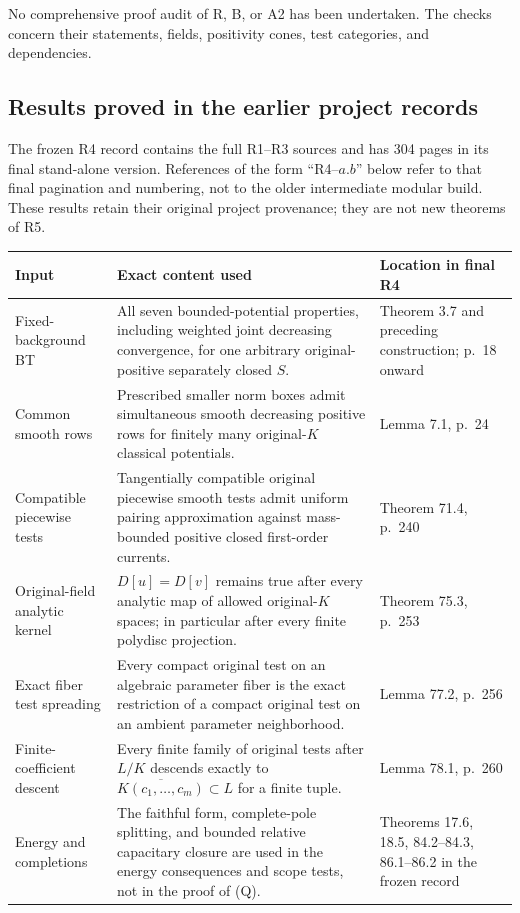 \documentclass[11pt,a4paper]{article}
\numberwithin{equation}{section}
\theoremstyle{definition}
\theoremstyle{remark}
\begin{document}
No comprehensive proof audit of R, B, or A2 has been undertaken.
The checks concern their statements, fields, positivity cones,
test categories, and dependencies.

\subsection{Results proved in the earlier project records}

The frozen R4 record contains the full R1--R3 sources and has
304 pages in its final stand-alone version. References of the
form ``R4--$a.b$'' below refer to that final pagination and
numbering, not to the older intermediate modular build. These
results retain their original project provenance; they are not
new theorems of R5.

\begin{longtable}{@{}p{}p{}p{}@{}}
\toprule
Input & Exact content used & Location in final R4\\
\midrule
\endhead
Fixed-background BT & All seven bounded-potential properties,
including weighted joint decreasing convergence, for one
arbitrary original-positive separately closed $S$. &
Theorem 3.7 and preceding construction; p.~18 onward\\
Common smooth rows & Prescribed smaller norm boxes admit
simultaneous smooth decreasing positive rows for finitely
many original-$K$ classical potentials. & Lemma 7.1, p.~24\\
Compatible piecewise tests & Tangentially compatible original
piecewise smooth tests admit uniform pairing approximation
against mass-bounded positive closed first-order currents. &
Theorem 71.4, p.~240\\
Original-field analytic kernel & $D[u]=D[v]$ remains true
after every analytic map of allowed original-$K$ spaces;
in particular after every finite polydisc projection. &
Theorem 75.3, p.~253\\
Exact fiber test spreading & Every compact original test on
an algebraic parameter fiber is the exact restriction of
a compact original test on an ambient parameter neighborhood. &
Lemma 77.2, p.~256\\
Finite-coefficient descent & Every finite family of original
tests after $L/K$ descends exactly to
$\overline{K(c_1,\ldots,c_m)}\subset L$ for a finite tuple. &
Lemma 78.1, p.~260\\
Energy and completions & The faithful form, complete-pole
splitting, and bounded relative capacitary closure are used
in the energy consequences and scope tests, not in the proof of (Q). &
Theorems 17.6, 18.5, 84.2--84.3, 86.1--86.2
in the frozen record\\
\bottomrule
\end{longtable}
\end{document}
